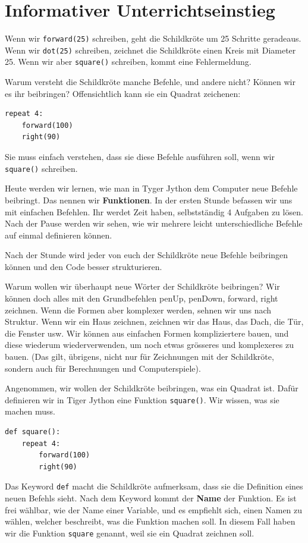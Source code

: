 \documentclass{article}
\begin{document}
\section{Informativer Unterrichtseinstieg}
Wenn wir \lstinline|forward(25)| schreiben, geht die Schildkröte um 25 Schritte geradeaus. Wenn wir \lstinline|dot(25)| schreiben, zeichnet die Schildkröte einen Kreis mit Diameter 25. Wenn wir aber \lstinline|square()| schreiben, kommt eine Fehlermeldung.

Warum versteht die Schildkröte manche Befehle, und andere nicht? Können wir es ihr beibringen? Offensichtlich kann sie ein Quadrat zeichenen:

\begin{lstlisting}
repeat 4:
	forward(100)
	right(90)
\end{lstlisting}

Sie muss einfach verstehen, dass sie diese Befehle ausführen soll, wenn wir \lstinline|square()| schreiben.

Heute werden wir lernen, wie man in Tyger Jython dem Computer neue Befehle beibringt. Das nennen wir \textbf{Funktionen}. In der ersten Stunde befassen wir uns mit einfachen Befehlen. Ihr werdet Zeit haben, selbstständig 4 Aufgaben zu lösen. Nach der Pause werden wir sehen, wie wir mehrere leicht unterschiedliche Befehle auf einmal definieren können.

Nach der Stunde wird jeder von euch der Schildkröte neue Befehle beibringen können und den Code besser strukturieren.

Warum wollen wir überhaupt neue Wörter der Schildkröte beibringen? Wir können doch alles mit den Grundbefehlen penUp, penDown, forward, right zeichnen.
Wenn die Formen aber komplexer werden, sehnen wir uns nach Struktur. Wenn wir ein Haus zeichnen, zeichnen wir das Haus, das Dach, die Tür, die Fenster usw. Wir können aus einfachen Formen kompliziertere bauen, und diese wiederum wiederverwenden, um noch etwas grösseres und komplexeres zu bauen. (Das gilt, übrigens, nicht nur für Zeichnungen mit der Schildkröte, sondern auch für Berechnungen und Computerspiele).

Angenommen, wir wollen der Schildkröte beibringen, was ein Quadrat ist. Dafür definieren wir in Tiger Jython eine Funktion \lstinline|square()|. Wir wissen, was sie machen muss.
\begin{lstlisting}
def square():
	repeat 4:
		forward(100)
		right(90)
\end{lstlisting}
Das Keyword \lstinline|def| macht die Schildkröte aufmerksam, dass sie die Definition eines neuen Befehls sieht. Nach dem Keyword kommt der \textbf{Name} der Funktion. Es ist frei wählbar, wie der Name einer Variable, und es empfiehlt sich, einen Namen zu wählen, welcher beschreibt, was die Funktion machen soll. In diesem Fall haben wir die Funktion \lstinline|square| genannt, weil sie ein Quadrat zeichnen soll.
\end{document}
